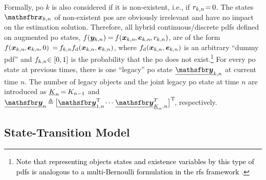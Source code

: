 \documentclass[10pt, twoside, romanappendices]{IEEEtran}
\providecommand{\rd}{\textcolor{black}}
\providecommand{\ist}{\hspace*{.3mm}}
\providecommand{\rmv}{\hspace*{-.3mm}}
\newcommand{\T}{\text{T}}
\begin{document}
Formally, \ac{po} $k$ is also considered if it is non-existent, i.e., if $r_{k,n} \!=\rmv 0$.  The states $\RV{x}_{k,n}$ of non-existent \acp{po} are obviously irrelevant and have no impact on the estimation solution. Therefore, all hybrid continuous/discrete \acp{pdf} defined on augmented \ac{po} states, $f(\V{y}_{k,n}) =\rmv f(\V{x}_{k,n}\rmv, \V{e}_{k,n}\rmv, r_{k,n})$, are of the form $f(\V{x}_{k,n}\rmv, \V{e}_{k,n}\rmv, 0 )$ $=\rmv f_{k,n} f_{\mathrm{d}}(\V{x}_{k,n},\V{e}_{k,n})$, where $f_{\mathrm{d}}(\bm{x}_{k,n},\bm{e}_{k,n})$ is an arbitrary ``dummy \ac{pdf}'' and $f_{k,n} \!\rmv\in [0,1]$ is the probability that the \ac{po} does not exist.\footnote{\rd{Note that representing objects states and existence variables by this type of \acp{pdf} is analogous to a multi-Bernoulli formulation in the \ac{rfs} framework \cite{Wil:J15,MeyKroWilLauHlaBraWin:J18,GraFatSve:J19}.}} For every \ac{po} state at previous times, there is one ``legacy'' \ac{po} state $\underline{\RV{y}}_{k,n}$ at current time $n$. The \vspace{0mm} number of legacy objects and the joint legacy \ac{po} state at time $n$ are \vspace{-.5mm} introduced as $\underline{K}_n \rmv=\rmv K_{n-1}$ and $\underline{\RV{y}}_n \rmv\triangleq\rmv \big[ \underline{\RV{y}}^{\T}_{1,n} \rmv\cdots\ist \underline{\RV{y}}^{T}_{\underline{K}_{n},n} \big]^{\T}\rmv\rmv$, respectively.


\subsection{State-Transition Model}
\label{sec:StateTransitionModel}
\end{document}

